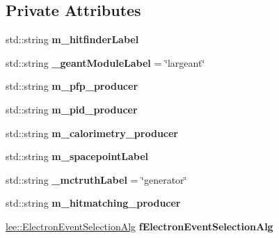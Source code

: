 \subsection*{Private Attributes}
\begin{DoxyCompactItemize}
\item 
\hypertarget{group__lee_gaf8a8c564772112b2c47945afcf674484}{std\-::string {\bfseries m\-\_\-hitfinder\-Label}}\label{group__lee_gaf8a8c564772112b2c47945afcf674484}

\item 
\hypertarget{group__lee_gaf68d4bc3b81df418e7925567e36e5996}{std\-::string {\bfseries \-\_\-geant\-Module\-Label} = \char`\"{}largeant\char`\"{}}\label{group__lee_gaf68d4bc3b81df418e7925567e36e5996}

\item 
\hypertarget{group__lee_ga4d931b0979f37341d7097520d6cb103d}{std\-::string {\bfseries m\-\_\-pfp\-\_\-producer}}\label{group__lee_ga4d931b0979f37341d7097520d6cb103d}

\item 
\hypertarget{group__lee_gac5fa9ebd50776233ccfbf82f5886411f}{std\-::string {\bfseries m\-\_\-pid\-\_\-producer}}\label{group__lee_gac5fa9ebd50776233ccfbf82f5886411f}

\item 
\hypertarget{group__lee_ga11a0a8879de1549d48e9fdfab8fc9365}{std\-::string {\bfseries m\-\_\-calorimetry\-\_\-producer}}\label{group__lee_ga11a0a8879de1549d48e9fdfab8fc9365}

\item 
\hypertarget{group__lee_ga7a5ae683e3f2b04f71812b689cd08b76}{std\-::string {\bfseries m\-\_\-spacepoint\-Label}}\label{group__lee_ga7a5ae683e3f2b04f71812b689cd08b76}

\item 
\hypertarget{group__lee_ga462f214c8a7ede15d53754c120f54d45}{std\-::string {\bfseries \-\_\-mctruth\-Label} = \char`\"{}generator\char`\"{}}\label{group__lee_ga462f214c8a7ede15d53754c120f54d45}

\item 
\hypertarget{group__lee_gafeca3ce0e272568cc6a1dbec12e87736}{std\-::string {\bfseries m\-\_\-hitmatching\-\_\-producer}}\label{group__lee_gafeca3ce0e272568cc6a1dbec12e87736}

\item 
\hypertarget{group__lee_gabc3e2092fa2fa08dce6f6eb6778519ce}{\hyperlink{classlee_1_1ElectronEventSelectionAlg}{lee\-::\-Electron\-Event\-Selection\-Alg} {\bfseries f\-Electron\-Event\-Selection\-Alg}}\label{group__lee_gabc3e2092fa2fa08dce6f6eb6778519ce}


\end{DoxyCompactItemize}
